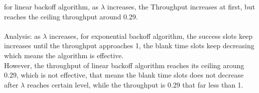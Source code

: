 \documentclass[paper=a4, fontsize=11pt]{scrartcl}
\numberwithin{equation}{section} %
\numberwithin{figure}{section} %
\numberwithin{table}{section} %
\begin{document}
        for linear backoff algorithm, as $\lambda$ increases, the Throughput increases at first, but reaches the ceiling throughput around 0.29.\\\\
        Analysis: as $\lambda$ increases, for exponential backoff algorithm, the success slots keep increases until the throughput approaches 1, the blank time slots keep decreasing which means the algorithm is effective.\\
        However, the throughput of linear backoff algorithm reaches its ceiling aroung 0.29, which is not effective, that means the blank time slots does not decrease after $\lambda$ reaches certain level, while the throughput is 0.29 that far less than 1.
\end{document}
